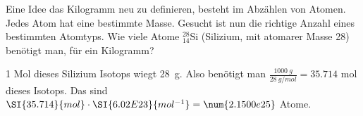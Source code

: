 

\begin{aufgabe}
	Eine Idee das Kilogramm neu zu definieren, besteht im Abzählen von Atomen. Jedes Atom hat eine bestimmte Masse.
	Gesucht ist nun die richtige Anzahl eines bestimmten Atomtyps.
	Wie viele Atome $^{28}_{14}\text{Si}$ (Silizium, mit atomarer Masse 28) benötigt man, für ein Kilogramm?
	\begin{loesung}
		1 Mol dieses Silizium Isotops wiegt \SI{28}{g}. Also benötigt man $\frac{\SI{1000}{g}}{\SI{28}{g/mol}}=\num{35.714}$ mol dieses Isotops.
		Das sind $\SI{35.714}{mol}\cdot\SI{6.02E23}{mol^{-1}}=\num{2.1500e25}$ Atome.
	\end{loesung}
\end{aufgabe}
